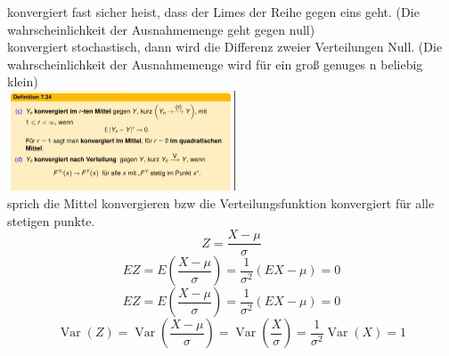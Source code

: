 \documentclass{article}
\begin{document}
	konvergiert fast sicher heist, dass der Limes der Reihe gegen eins geht. (Die wahrscheinlichkeit der Ausnahmemenge geht gegen null)\\
	konvergiert stochastisch, dann wird die Differenz zweier Verteilungen Null. (Die wahrscheinlichkeit der Ausnahmemenge wird für ein groß genuges n beliebig klein)\\
	\includegraphics[width=256px]{KonvImErstenMittel.png}\\
	sprich die Mittel konvergieren bzw die Verteilungsfunktion konvergiert für alle stetigen punkte.\\
	\[Z=\frac{X-\mu}{\sigma}\]
	\[EZ=E(\frac{X-\mu}{\sigma}) = \frac{1}{\sigma^2} (EX-\mu)=0\]
	\[EZ=E(\frac{X-\mu}{\sigma}) = \frac{1}{\sigma^2} (EX-\mu)=0\]
	\[\operatorname{Var}(Z)= \operatorname{Var}\left(\frac{X-\mu}{\sigma}\right)=\operatorname{Var}\left(\frac{X}{\sigma}\right) =\frac{1}{\sigma^2} \operatorname{Var}(X) = 1\]
\end{document}
